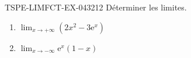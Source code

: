 \begin{exercice}{TSPE-LIMFCT-EX-043}{2}{12}
Déterminer les limites.
\begin{enumerate}
  \item $\lim_{x \to +\infty} (2x^2 - 3\mathrm{e}^x)$
  \item $\lim_{x \to -\infty} \mathrm{e}^x(1 - x)$
\end{enumerate}
\end{exercice}
